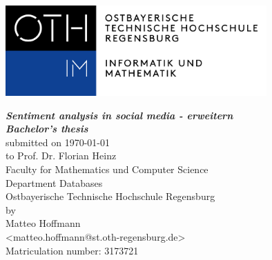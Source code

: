 \begin{titlepage}

\includegraphics[angle=0,width=10cm]{Titelseite/oth.png}

\begin{center}
\vspace*{2\baselineskip}
\LARGE \textbf{\textsf{\textit{
Sentiment analysis in social media - erweitern
}}} \\
\vspace{1cm}
\LARGE\textbf{\textsf{\textit{Bachelor's thesis}}} \\
\vspace{1cm}
\Large{
submitted on \today \\
to Prof. Dr. Florian Heinz \\
Faculty for Mathematics und Computer Science \\
Department Databases \\
Ostbayerische Technische Hochschule Regensburg \\
\vspace{1cm}
by \\
Matteo Hoffmann \\
<matteo.hoffmann@st.oth-regensburg.de> \\
Matriculation number: 3173721 \\
}
\vspace{1cm}

\end{center}

\end{titlepage}

